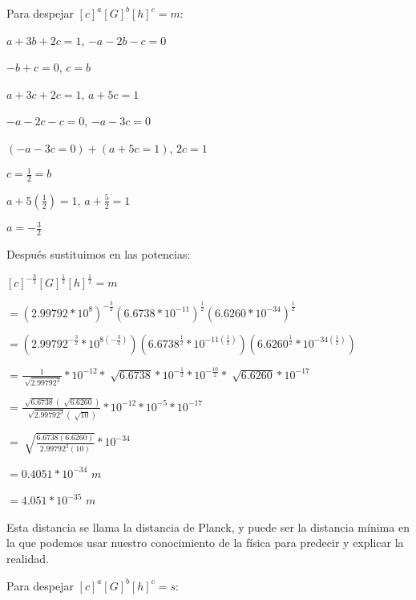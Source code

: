 \documentclass[10pt, a4paper]{article}
\begin{document}
\begin{enumerate}
\begin{itemize}
                Para despejar $[c]^{a}[G]^{b}[h]^{c}=\si{m}$:
                \begin{center}
                
                    $a+3b+2c=1$, $-a-2b-c=0$

                    $-b+c=0$, $c=b$

                    $a+3c+2c=1$, $a+5c=1$

                    $-a-2c-c=0$, $-a-3c=0$
                    
                    $(-a-3c=0)+(a+5c=1)$, $2c=1$
                    
                    $c=\frac{1}{2}=b$

                    $a+5(\frac{1}{2})=1$, $a+\frac{5}{2}=1$

                    $a=-\frac{3}{2}$
                \end{center}

                Después sustituimos en las potencias:
                \begin{center}
                    $[c]^{-\frac{3}{2}}[G]^{\frac{1}{2}}[h]^{\frac{1}{2}}=\si{m}$

                    $=(2.99792 * 10^8)^{-\frac{3}{2}}(6.6738 * 10^{-11})^{\frac{1}{2}}(6.6260 * 10^{-34})^{\frac{1}{2}}$

                    $=(2.99792^{-\frac{3}{2}} * 10^{8(-\frac{3}{2})})(6.6738^{\frac{1}{2}} * 10^{-11(\frac{1}{2})})(6.6260^{\frac{1}{2}} * 10^{-34(\frac{1}{2})})$

                    $=\frac{1}{\sqrt[]{2.99792^3}} * 10^{-12} * \sqrt[]{6.6738} * 10^{-\frac{1}{2}} * 10^{-\frac{10}{2}} * \sqrt[]{6.6260} * 10^{-17}$

                    $=\frac{\sqrt[]{6.6738}(\sqrt[]{6.6260})}{\sqrt[]{2.99792^3}(\sqrt[]{10})}*10^{-12}*10^{-5}*10^{-17}$
                    
                    $=\sqrt[]{\frac{6.6738(6.6260)}{2.99792^3(10)}}*10^{-34}$

                    $=0.4051*10^{-34}$ $\si{m}$

                    $=4.051*10^{-35}$ $\si{m}$
                \end{center}

                Esta distancia se llama la distancia de Planck, y puede ser la distancia mínima en la que 
                podemos usar nuestro conocimiento de la física para predecir y explicar la realidad.

                Para despejar $[c]^{a}[G]^{b}[h]^{c}=\si{s}$:
                \begin{center}
                

\end{center}
\end{itemize}
\end{enumerate}
\end{document}
